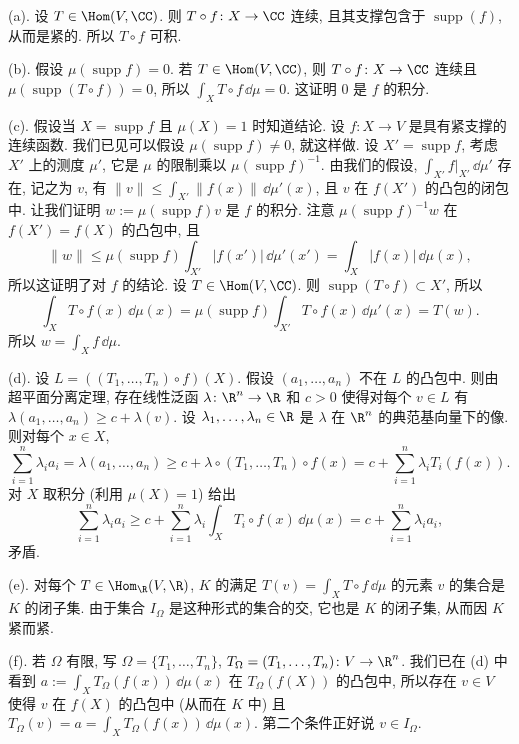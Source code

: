 \begin{solution}
(a). 设 $T \in \Hom(V, \CC)$. 则 $T \circ f \colon X \to \CC$ 连续, 且其支撑包含于 $\operatorname{supp}(f)$, 从而是紧的. 所以 $T \circ f$ 可积.

(b). 假设 $\mu(\operatorname{supp} f) = 0$. 若 $T \in \Hom(V, \CC)$, 则 $T \circ f \colon X \to \CC$ 连续且 $\mu(\operatorname{supp}(T \circ f)) = 0$, 所以 $\int_X T \circ f\,\dd\mu = 0$. 这证明 $0$ 是 $f$ 的积分.

(c). 假设当 $X = \operatorname{supp} f$ 且 $\mu(X) = 1$ 时知道结论. 设 $f \colon X \to V$ 是具有紧支撑的连续函数. 我们已见可以假设 $\mu(\operatorname{supp} f) \neq 0$, 就这样做. 设 $X' = \operatorname{supp} f$, 考虑 $X'$ 上的测度 $\mu'$, 它是 $\mu$ 的限制乘以 $\mu(\operatorname{supp} f)^{-1}$. 由我们的假设, $\int_{X'}f|_{X'}\,\dd\mu'$ 存在, 记之为 $v$, 有 $\|v\| \leq \int_{X'}\|f(x)\|\,\dd\mu'(x)$, 且 $v$ 在 $f(X')$ 的凸包的闭包中.
让我们证明 $w := \mu(\operatorname{supp} f)v$ 是 $f$ 的积分. 注意 $\mu(\operatorname{supp} f)^{-1}w$ 在 $f(X') = f(X)$ 的凸包中, 且
\[
\|w\| \leq \mu(\operatorname{supp} f)\int_{X'}|f(x')|\,\dd\mu'(x') = \int_X |f(x)|\,\dd\mu(x),
\]
所以这证明了对 $f$ 的结论.
设 $T \in \Hom(V, \CC)$. 则 $\operatorname{supp}(T \circ f) \subset X'$, 所以
\[
\int_X T \circ f(x)\,\dd\mu(x) = \mu(\operatorname{supp} f)\int_{X'}T \circ f(x)\,\dd\mu'(x) = T(w).
\]
所以 $w = \int_X f\,\dd\mu$.

(d). 设 $L = ((T_1, \ldots, T_n) \circ f)(X)$. 假设 $(a_1, \ldots, a_n)$ 不在 $L$ 的凸包中. 则由超平面分离定理, 存在线性泛函 $\lambda \colon \R^n \to \R$ 和 $c > 0$ 使得对每个 $v \in L$ 有 $\lambda(a_1, \ldots, a_n) \geq c + \lambda(v)$. 设 $\lambda_1, \ldots, \lambda_n \in \R$ 是 $\lambda$ 在 $\R^n$ 的典范基向量下的像. 则对每个 $x \in X$,
\[
\sum_{i=1}^n\lambda_ia_i = \lambda(a_1, \ldots, a_n) \geq c + \lambda \circ (T_1, \ldots, T_n) \circ f(x) = c + \sum_{i=1}^n\lambda_iT_i(f(x)).
\]
对 $X$ 取积分 (利用 $\mu(X) = 1$) 给出
\[
\sum_{i=1}^n\lambda_ia_i \geq c + \sum_{i=1}^n\lambda_i\int_X T_i \circ f(x)\,\dd\mu(x) = c + \sum_{i=1}^n\lambda_ia_i,
\]
矛盾.

(e). 对每个 $T \in \Hom_{\R}(V, \R)$, $K$ 的满足 $T(v) = \int_X T \circ f\,\dd\mu$ 的元素 $v$ 的集合是 $K$ 的闭子集. 由于集合 $I_{\Omega}$ 是这种形式的集合的交, 它也是 $K$ 的闭子集, 从而因 $K$ 紧而紧.

(f). 若 $\Omega$ 有限, 写 $\Omega = \{T_1, \ldots, T_n\}$, $T_{\Omega} = (T_1, \ldots, T_n) \colon V \to \R^n$. 我们已在 (d) 中看到 $a := \int_X T_{\Omega}(f(x))\,\dd\mu(x)$ 在 $T_{\Omega}(f(X))$ 的凸包中, 所以存在 $v \in V$ 使得 $v$ 在 $f(X)$ 的凸包中 (从而在 $K$ 中) 且 $T_{\Omega}(v) = a = \int_X T_{\Omega}(f(x))\,\dd\mu(x)$. 第二个条件正好说 $v \in I_{\Omega}$.


\end{solution}
